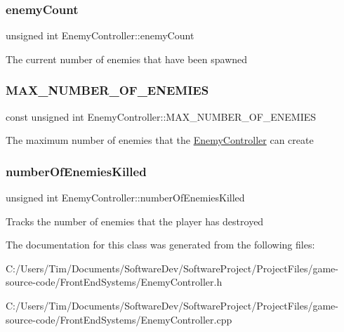\subsubsection{\texorpdfstring{enemy\+Count}{enemyCount}}
{\footnotesize\ttfamily unsigned int Enemy\+Controller\+::enemy\+Count\hspace{0.3cm}{\ttfamily [private]}}

The current number of enemies that have been spawned \mbox{\label{class_enemy_controller_aca04264b909526dadc67a41f8c826aee}} 
\subsubsection{\texorpdfstring{M\+A\+X\+\_\+\+N\+U\+M\+B\+E\+R\+\_\+\+O\+F\+\_\+\+E\+N\+E\+M\+I\+ES}{MAX\_NUMBER\_OF\_ENEMIES}}
{\footnotesize\ttfamily const unsigned int Enemy\+Controller\+::\+M\+A\+X\+\_\+\+N\+U\+M\+B\+E\+R\+\_\+\+O\+F\+\_\+\+E\+N\+E\+M\+I\+ES\hspace{0.3cm}{\ttfamily [private]}}

The maximum number of enemies that the \hyperlink{class_enemy_controller}{Enemy\+Controller} can create \mbox{\label{class_enemy_controller_a2b2fdb5b40b75f719838da0386861da5}} 
\subsubsection{\texorpdfstring{number\+Of\+Enemies\+Killed}{numberOfEnemiesKilled}}
{\footnotesize\ttfamily unsigned int Enemy\+Controller\+::number\+Of\+Enemies\+Killed\hspace{0.3cm}{\ttfamily [private]}}

Tracks the number of enemies that the player has destroyed 

The documentation for this class was generated from the following files\+:\begin{DoxyCompactItemize}
\item 
C\+:/\+Users/\+Tim/\+Documents/\+Software\+Dev/\+Software\+Project/\+Project\+Files/game-\/source-\/code/\+Front\+End\+Systems/Enemy\+Controller.\+h\item 
C\+:/\+Users/\+Tim/\+Documents/\+Software\+Dev/\+Software\+Project/\+Project\+Files/game-\/source-\/code/\+Front\+End\+Systems/Enemy\+Controller.\+cpp\end{DoxyCompactItemize}
